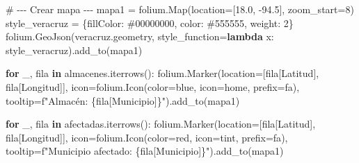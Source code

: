 \documentclass[
  spanish,
  us-letterpaper,
  DIV=11,
  numbers=noendperiod]{scrreprt}
\newenvironment{Shaded}{\begin{snugshade}}{\end{snugshade}}
\newcommand{\CommentTok}[1]{\textcolor[rgb]{0.37,0.37,0.37}{#1}}
\newcommand{\ControlFlowTok}[1]{\textcolor[rgb]{0.00,0.23,0.31}{\textbf{#1}}}
\newcommand{\DecValTok}[1]{\textcolor[rgb]{0.68,0.00,0.00}{#1}}
\newcommand{\FloatTok}[1]{\textcolor[rgb]{0.68,0.00,0.00}{#1}}
\newcommand{\KeywordTok}[1]{\textcolor[rgb]{0.00,0.23,0.31}{\textbf{#1}}}
\newcommand{\NormalTok}[1]{\textcolor[rgb]{0.00,0.23,0.31}{#1}}
\newcommand{\OperatorTok}[1]{\textcolor[rgb]{0.37,0.37,0.37}{#1}}
\newcommand{\SpecialCharTok}[1]{\textcolor[rgb]{0.37,0.37,0.37}{#1}}
\newcommand{\SpecialStringTok}[1]{\textcolor[rgb]{0.13,0.47,0.30}{#1}}
\newcommand{\StringTok}[1]{\textcolor[rgb]{0.13,0.47,0.30}{#1}}
\numberwithin{equation}{section}
\begin{document}
\begin{Shaded}
\begin{Highlighting}[]
\CommentTok{\# {-}{-}{-} Crear mapa {-}{-}{-}}
\NormalTok{mapa1 }\OperatorTok{=}\NormalTok{ folium.Map(location}\OperatorTok{=}\NormalTok{[}\FloatTok{18.0}\NormalTok{, }\OperatorTok{{-}}\FloatTok{94.5}\NormalTok{], zoom\_start}\OperatorTok{=}\DecValTok{8}\NormalTok{)}
\NormalTok{style\_veracruz }\OperatorTok{=}\NormalTok{ \{}\StringTok{\textquotesingle{}fillColor\textquotesingle{}}\NormalTok{: }\StringTok{\textquotesingle{}\#00000000\textquotesingle{}}\NormalTok{,}
 \StringTok{\textquotesingle{}color\textquotesingle{}}\NormalTok{: }\StringTok{\textquotesingle{}\#555555\textquotesingle{}}\NormalTok{, }\StringTok{\textquotesingle{}weight\textquotesingle{}}\NormalTok{: }\DecValTok{2}\NormalTok{\}}
\NormalTok{folium.GeoJson(veracruz.geometry,}
\NormalTok{ style\_function}\OperatorTok{=}\KeywordTok{lambda}\NormalTok{ x: style\_veracruz).add\_to(mapa1)}

\ControlFlowTok{for}\NormalTok{ \_, fila }\KeywordTok{in}\NormalTok{ almacenes.iterrows():}
\NormalTok{    folium.Marker(location}\OperatorTok{=}\NormalTok{[fila[}\StringTok{\textquotesingle{}Latitud\textquotesingle{}}\NormalTok{],}
\NormalTok{     fila[}\StringTok{\textquotesingle{}Longitud\textquotesingle{}}\NormalTok{]],}
\NormalTok{                  icon}\OperatorTok{=}\NormalTok{folium.Icon(color}\OperatorTok{=}\StringTok{\textquotesingle{}blue\textquotesingle{}}\NormalTok{,}
\NormalTok{                   icon}\OperatorTok{=}\StringTok{\textquotesingle{}home\textquotesingle{}}\NormalTok{, prefix}\OperatorTok{=}\StringTok{\textquotesingle{}fa\textquotesingle{}}\NormalTok{),}
\NormalTok{                  tooltip}\OperatorTok{=}\SpecialStringTok{f"Almacén: }\SpecialCharTok{\{}\NormalTok{fila[}\StringTok{\textquotesingle{}Municipio\textquotesingle{}}\NormalTok{]}\SpecialCharTok{\}}\SpecialStringTok{"}\NormalTok{).add\_to(mapa1)}

\ControlFlowTok{for}\NormalTok{ \_, fila }\KeywordTok{in}\NormalTok{ afectadas.iterrows():}
\NormalTok{    folium.Marker(location}\OperatorTok{=}\NormalTok{[fila[}\StringTok{\textquotesingle{}Latitud\textquotesingle{}}\NormalTok{],}
\NormalTok{     fila[}\StringTok{\textquotesingle{}Longitud\textquotesingle{}}\NormalTok{]],}
\NormalTok{        icon}\OperatorTok{=}\NormalTok{folium.Icon(color}\OperatorTok{=}\StringTok{\textquotesingle{}red\textquotesingle{}}\NormalTok{,}
\NormalTok{         icon}\OperatorTok{=}\StringTok{\textquotesingle{}tint\textquotesingle{}}\NormalTok{, prefix}\OperatorTok{=}\StringTok{\textquotesingle{}fa\textquotesingle{}}\NormalTok{),}
\NormalTok{        tooltip}\OperatorTok{=}\SpecialStringTok{f"Municipio afectado: }\SpecialCharTok{\{}\NormalTok{fila[}\StringTok{\textquotesingle{}Municipio\textquotesingle{}}\NormalTok{]}\SpecialCharTok{\}}\SpecialStringTok{"}\NormalTok{).add\_to(mapa1)}


\end{Highlighting}
\end{Shaded}
\end{document}
